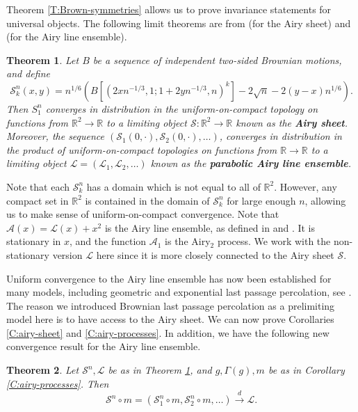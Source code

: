 \documentclass[aop, preprint]{imsart}
\theoremstyle{plain}
\newtheorem{theorem}{Theorem}[section]
\theoremstyle{definition}
\theoremstyle{plain}
\newcommand{\Ga}{\Gamma}
\newcommand{\scrA}{\mathcal{A}}
\newcommand{\scrL}{\mathcal{L}}
\newcommand{\scrS}{\mathcal{S}}
\newcommand{\R}{\mathds{R}}
\newcommand{\cvgd}{\stackrel{d}{\to}}
\newcommand{\lf}{\left}
\newcommand{\rg}{\right}
\begin{document}
Theorem \ref{T:Brown-symmetries} allows us to prove invariance statements for universal objects. The following limit theorems are from \citep{DOV} (for the Airy sheet) and \citep{CH} (for the Airy line ensemble).

\begin{theorem}
	\label{T:airy-limit}
	Let $B$ be a sequence of independent two-sided Brownian motions, and define 
	$$
	\scrS_k^n(x, y) = n^{1/6}\lf(B[(2xn^{-1/3}, 1; 1 + 2yn^{-1/3}, n)^k] - 2\sqrt{n} - 2(y-x)n^{1/6}\rg).
	$$
	Then $S^n_1$ converges in distribution in the uniform-on-compact topology on functions from $\R^2 \to \R$ to a limiting object $\scrS:\R^2 \to \R$ known as the \textbf{Airy sheet}. Moreover, the sequence $(\scrS_1(0, \cdot), \scrS_2(0, \cdot), \dots)$,  converges in distribution in the product of uniform-on-compact topologies on functions from $\R \to \R$ to a limiting object $\scrL = (\scrL_1, \scrL_2, \dots)$ known as the \textbf{parabolic Airy line ensemble}.
\end{theorem}


Note that each $\scrS^n_k$ has a domain which is not equal to all of $\R^2$. However, any compact set in $\R^2$ is contained in the domain of $\scrS^n_k$ for large enough $n$, allowing us to make sense of uniform-on-compact convergence. Note that $\scrA(x) = \scrL(x) + x^2$ is the Airy line ensemble, as defined in \cite{prahofer2002scale} and \cite{CH}. It is stationary in $x$, and the function $\scrA_1$ is the Airy$_2$ process. We work with the non-stationary version $\scrL$ here since it is more closely connected to the Airy sheet $\scrS$.

Uniform convergence to the Airy line ensemble has now been established for many models, including geometric and exponential last passage percolation, see \citep{dauvergne2019uniform}. 
The reason we introduced Brownian last passage percolation as a prelimiting model here is to have access to the Airy sheet. We can now prove Corollaries \ref{C:airy-sheet} and \ref{C:airy-processes}. In addition, we have the following new convergence result for the Airy line ensemble.

\begin{theorem}
	\label{T:airy-symm}
	Let $\scrS^n, \scrL$ be as in Theorem \ref{T:airy-limit}, and $g, \Ga(g), m$ be as in Corollary \ref{C:airy-processes}. Then 
	$$
	\scrS^n \circ m = (\scrS^n_1 \circ m, \scrS^n_2 \circ m, \dots) \cvgd \scrL.
	$$
\end{theorem}
\end{document}
